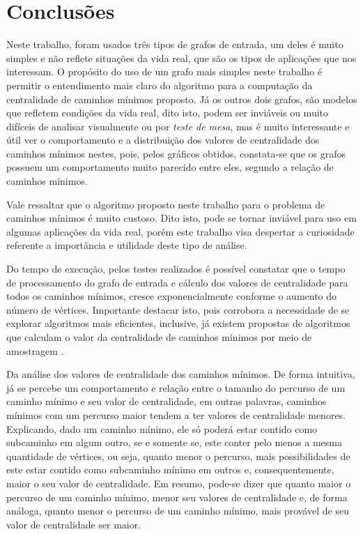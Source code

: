 \chapter{Conclusões}

Neste trabalho, foram usados três tipos de grafos de entrada, um deles é muito simples e não reflete situações da vida real, que são os tipos de aplicações que nos interessam. O propósito do uso de um grafo mais simples neste trabalho é permitir o entendimento mais claro do algoritmo para a computação da centralidade de caminhos mínimos proposto. Já os outros dois grafos, são modelos que refletem condições da vida real, dito isto, podem ser inviáveis ou muito difíceis de analisar visualmente ou por \emph{teste de mesa}, mas é muito interessante e útil ver o comportamento e a distribuição dos valores de centralidade dos caminhos mínimos nestes, pois, pelos gráficos obtidos, constata-se que os grafos possuem um comportamento muito parecido entre eles, segundo a relação de caminhos mínimos.

Vale ressaltar que o algoritmo proposto neste trabalho para o problema de caminhos mínimos é muito custoso. Dito isto, pode se tornar inviável para uso em algumas aplicações da vida real, porém este trabalho visa despertar a curiosidade referente a importância e utilidade deste tipo de análise.

Do tempo de execução, pelos testes realizados é possível constatar que o tempo de processamento do grafo de entrada e cálculo dos valores de centralidade para todos os caminhos mínimos, cresce exponencialmente conforme o aumento do número de vértices. Importante destacar isto, pois corrobora a necessidade de se explorar algoritmos mais eficientes, inclusive, já existem propostas de algoritmos que calculam o valor da centralidade de caminhos mínimos por meio de amostragem \cite{alane2021}.

Da análise dos valores de centralidade dos caminhos mínimos. De forma intuitiva, já se percebe um comportamento e relação entre o tamanho do percurso de um caminho mínimo e seu valor de centralidade, em outras palavras, caminhos mínimos com um percurso maior tendem a ter valores de centralidade menores. Explicando, dado um caminho mínimo, ele só poderá estar contido como subcaminho em algum outro, se e somente se, este conter pelo menos a mesma quantidade de vértices, ou seja, quanto menor o percurso, mais possibilidades de este estar contido como subcaminho mínimo em outros e, consequentemente, maior o seu valor de centralidade. Em resumo, pode-se dizer que quanto maior o percurso de um caminho mínimo, menor seu valores de centralidade e, de forma análoga, quanto menor o percurso de um caminho mínimo, mais provável de seu valor de centralidade ser maior.

